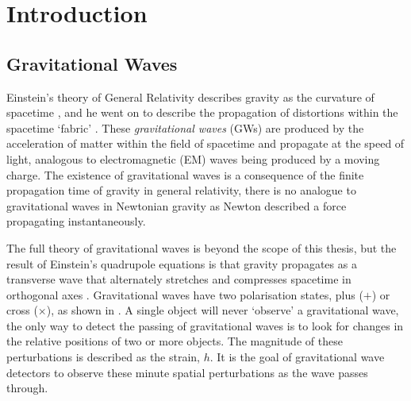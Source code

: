 \chapter{Introduction}
\label{chap:intro}
\chaptoc{}


\newpage
\section{Gravitational Waves}
\label{sec:gw}
\begin{colsection}


\begin{colsection}

Einstein's theory of General Relativity describes gravity as the curvature of spacetime \citep{Einstein1914}, and he went on to describe the propagation of distortions within the spacetime `fabric' \citep{Einstein1916}. These \emph{gravitational waves} (GWs) are produced by the acceleration of matter within the field of spacetime and propagate at the speed of light, analogous to electromagnetic (EM) waves being produced by a moving charge. The existence of gravitational waves is a consequence of the finite propagation time of gravity in general relativity, there is no analogue to gravitational waves in Newtonian gravity as Newton described a force propagating instantaneously.

The full theory of gravitational waves is beyond the scope of this thesis, but the result of Einstein's quadrupole equations is that gravity propagates as a transverse wave that alternately stretches and compresses spacetime in orthogonal axes \citep{BIGcardiff}. Gravitational waves have two polarisation states, plus ($+$) or cross ($\times$), as shown in . A single object will never `observe' a gravitational wave, the only way to detect the passing of gravitational waves is to look for changes in the relative positions of two or more objects. The magnitude of these perturbations is described as the strain, $h$. It is the goal of gravitational wave detectors to observe these minute spatial perturbations as the wave passes through.


\end{colsection}
\end{colsection}

